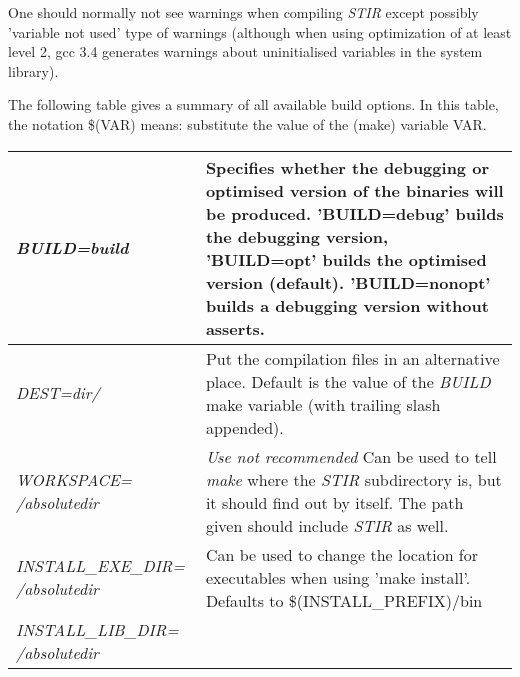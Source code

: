 \documentclass{article}
\begin{document}
One should normally not see warnings when compiling \textit{STIR}
except possibly 'variable not used' type of warnings (although when using
optimization of at least level 2, gcc 3.4 
generates warnings about uninitialised variables in the system library).


The following table gives a summary of all available build options. 
In this table, the notation \$(VAR) means: substitute the value of the
(make) variable VAR.


\newlength{\MakeTableFirstCol}
\newlength{\MakeTableSecondCol}
\setlength{\MakeTableFirstCol}{2.5in}
\setlength{\MakeTableSecondCol}{\textwidth}
\addtolength{\MakeTableSecondCol}{-\MakeTableFirstCol}
\begin{longtable}{|p{\MakeTableFirstCol}|p{\MakeTableSecondCol}|}
\hline

{\raggedright
\textit{BUILD=build}} & 

{\raggedright
Specifies whether the debugging or optimised version of the 
binaries will be produced. 'BUILD=debug' builds the debugging 
version, 'BUILD=opt' builds the optimised version (default).
'BUILD=nonopt' builds a debugging version without asserts.} \\
\hline

{\raggedright
\textit{DEST=dir/}} & 

{\raggedright
Put the compilation files in an alternative place. Default is the value
of the \textit{BUILD} make variable (with trailing slash appended).} \\
\hline

{\raggedright
\textit{WORKSPACE= \linebreak
/absolutedir}} & 

{\raggedright
\textit{Use not recommended} \linebreak
Can be used to tell \textit{make} where the \textit{STIR} subdirectory is, 
but it should find out by itself. The path given should include 
\textit{STIR} as well.} \\
\hline

{\raggedright
\textit{INSTALL\_EXE\_DIR= \linebreak
/absolutedir}} & 

{\raggedright
Can be used to change the location for executables when using 
'make install'. Defaults to \$(INSTALL\_PREFIX)/bin} \\
\hline

{\raggedright
\textit{INSTALL\_LIB\_DIR= \linebreak
/absolutedir}} & 


\end{longtable}
\end{document}
